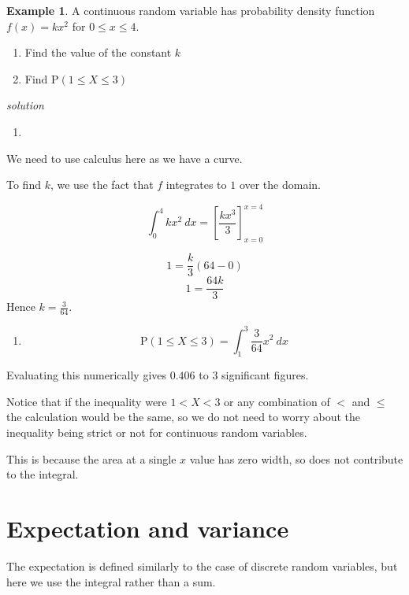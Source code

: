 \documentclass[
]{book}
\providecommand{\tightlist}{%
  \setlength{\itemsep}{0pt}\setlength{\parskip}{0pt}}
\theoremstyle{definition}
\theoremstyle{definition}
\newtheorem{example}{Example}[chapter]
\theoremstyle{definition}
\theoremstyle{definition}
\theoremstyle{remark}
\begin{document}
\begin{example}
A continuous random variable has probability density function \(f(x) = kx^2\) for \(0\leq x\leq 4\).

\begin{enumerate}
\def\labelenumi{\alph{enumi})}
\item
  Find the value of the constant \(k\)
\item
  Find \(\text{P}(1\leq X \leq 3)\)
\end{enumerate}

\emph{solution}

\begin{enumerate}
\def\labelenumi{\alph{enumi})}
\item
\end{enumerate}

We need to use calculus here as we have a curve.

To find \(k\), we use the fact that \(f\) integrates to \(1\) over the domain.

\[ \int_{0}^{4}kx^2 \ dx = \left[ \frac{kx^3}{3}\right]^{x=4}_{x=0}\]

\[ 1= \frac{k}{3} (64-0)\]
\[ 1= \frac{64k}{3} \]
Hence \(k=\frac{3}{64}\).

\begin{enumerate}
\def\labelenumi{\alph{enumi})}
\setcounter{enumi}{1}
\tightlist
\item
  \[\text{P}(1\leq X \leq 3) = \int_{1}^{3} \frac{3}{64}x^2 \ dx\]
\end{enumerate}

Evaluating this numerically gives \(0.406\) to \(3\) significant figures.
\end{example}

Notice that if the inequality were \(1<X<3\) or any combination of \(<\) and \(\leq\) the calculation would be the same, so we do not need to worry about the inequality being strict or not for continuous random variables.

This is because the area at a single \(x\) value has zero width, so does not contribute to the integral.

\hypertarget{expectation-and-variance}{%
\section{Expectation and variance}\label{expectation-and-variance}}

The expectation is defined similarly to the case of discrete random variables, but here we use the integral rather than a sum.
\end{document}
